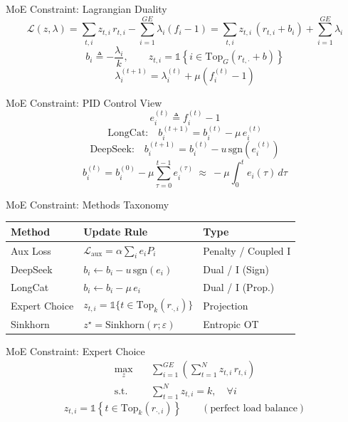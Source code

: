 \documentclass{beamer}
\begin{document}
\begin{frame}{MoE Constraint: Lagrangian Duality}
\[
\mathcal{L}(z,\lambda)
= \sum_{t,i} z_{t,i}\, r_{t,i} - \sum_{i=1}^{GE} \lambda_i (f_i - 1)
= \sum_{t,i} z_{t,i}\, (r_{t,i} + b_i) + \sum_{i=1}^{GE}\lambda_i
\]
\[
b_i \triangleq -\frac{\lambda_i}{k},
\qquad
z_{t,i} = \mathbb{1}\!\left\{i \in \mathrm{Top}_G(r_{t,\cdot} + b)\right\}
\]
\[
\lambda_i^{(t+1)} = \lambda_i^{(t)} + \mu (f_i^{(t)} - 1)
\]
\end{frame}

\begin{frame}{MoE Constraint: PID Control View}
\[
e_i^{(t)} \triangleq f_i^{(t)} - 1
\]
\[
\text{LongCat:}\quad b_i^{(t+1)} = b_i^{(t)} - \mu\, e_i^{(t)}
\]
\[
\text{DeepSeek:}\quad b_i^{(t+1)} = b_i^{(t)} - u\,\mathrm{sgn}(e_i^{(t)})
\]
\[
b_i^{(t)} = b_i^{(0)} - \mu \sum_{\tau=0}^{t-1} e_i^{(\tau)}
\ \approx\ -\mu \int_0^t e_i(\tau)\, d\tau
\]
\end{frame}

\begin{frame}{MoE Constraint: Methods Taxonomy}
\begin{table}
\centering
\small
\begin{tabular}{@{}lll@{}}
\toprule
\textbf{Method} & \textbf{Update Rule} & \textbf{Type} \\
\midrule
Aux Loss & $\mathcal{L}_{\text{aux}} = \alpha \sum_i e_i P_i$ & Penalty / Coupled I \\
DeepSeek & $b_i \leftarrow b_i - u\,\mathrm{sgn}(e_i)$ & Dual / I (Sign) \\
LongCat & $b_i \leftarrow b_i - \mu\, e_i$ & Dual / I (Prop.) \\
Expert Choice & $z_{t,i}=\mathbb{1}\{t\in \mathrm{Top}_k(r_{\cdot,i})\}$ & Projection \\
Sinkhorn & $z^\star = \mathrm{Sinkhorn}(r;\varepsilon)$ & Entropic OT \\
\bottomrule
\end{tabular}
\end{table}
\end{frame}

\begin{frame}{MoE Constraint: Expert Choice}
\begin{align*}
\max_{z} \quad & \sum_{i=1}^{GE}\left(\sum_{t=1}^N z_{t,i}\, r_{t,i}\right) \\
\text{s.t.}\quad & \sum_{t=1}^N z_{t,i} = k,\quad \forall i
\end{align*}
\[
z_{t,i} = \mathbb{1}\!\left\{t \in \mathrm{Top}_k(r_{\cdot,i})\right\}
\qquad (\text{perfect load balance})
\]
\end{frame}
\end{document}
